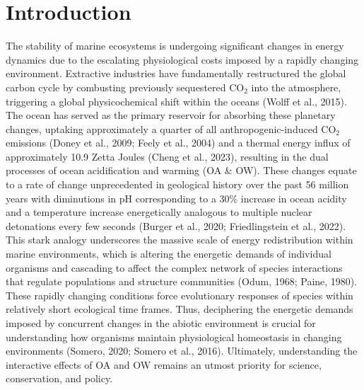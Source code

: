 \documentclass{CSUNthesis}
\begin{document}
\section*{Introduction}\label{introduction}

The stability of marine ecosystems is undergoing significant changes in energy dynamics due to the escalating physiological costs imposed by a rapidly changing environment. Extractive industries have fundamentally restructured the global carbon cycle by combusting previously sequestered CO\(_2\) into the atmosphere, triggering a global physicochemical shift within the oceans (Wolff et al., 2015). The ocean has served as the primary reservoir for absorbing these planetary changes, uptaking approximately a quarter of all anthropogenic-induced CO\(_2\) emissions (Doney et al., 2009; Feely et al., 2004) and a thermal energy influx of approximately 10.9 Zetta Joules (Cheng et al., 2023), resulting in the dual processes of ocean acidification and warming (OA \& OW). These changes equate to a rate of change unprecedented in geological history over the past 56 million years with diminutions in pH corresponding to a 30\% increase in ocean acidity and a temperature increase energetically analogous to multiple nuclear detonations every few seconds (Burger et al., 2020; Friedlingstein et al., 2022). This stark analogy underscores the massive scale of energy redistribution within marine environments, which is altering the energetic demands of individual organisms and cascading to affect the complex network of species interactions that regulate populations and structure communities (Odum, 1968; Paine, 1980). These rapidly changing conditions force evolutionary responses of species within relatively short ecological time frames. Thus, deciphering the energetic demands imposed by concurrent changes in the abiotic environment is crucial for understanding how organisms maintain physiological homeostasis in changing environments (Somero, 2020; Somero et al., 2016). Ultimately, understanding the interactive effects of OA and OW remains an utmost priority for science, conservation, and policy.
\end{document}

